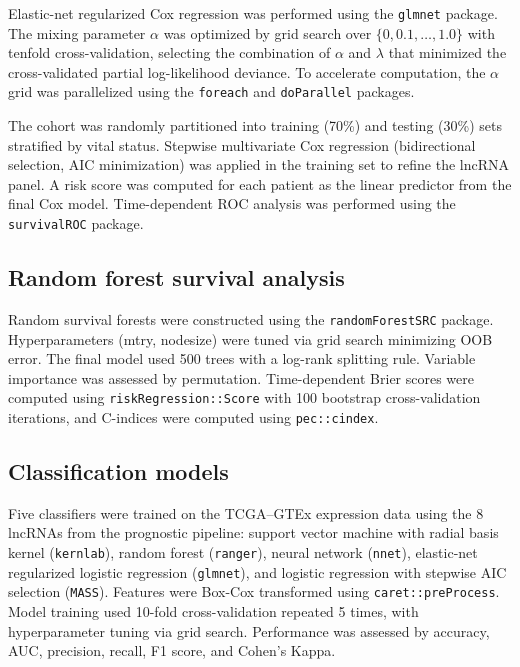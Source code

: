 \documentclass[fleqn,10pt]{wlscirep}
\begin{document}
Elastic-net regularized Cox regression was performed using the \texttt{glmnet} package. The mixing parameter $\alpha$ was optimized by grid search over $\{0, 0.1, \ldots, 1.0\}$ with tenfold cross-validation, selecting the combination of $\alpha$ and $\lambda$ that minimized the cross-validated partial log-likelihood deviance. To accelerate computation, the $\alpha$ grid was parallelized using the \texttt{foreach} and \texttt{doParallel} packages.

The cohort was randomly partitioned into training (70\%) and testing (30\%) sets stratified by vital status. Stepwise multivariate Cox regression (bidirectional selection, AIC minimization) was applied in the training set to refine the lncRNA panel. A risk score was computed for each patient as the linear predictor from the final Cox model. Time-dependent ROC analysis was performed using the \texttt{survivalROC} package.

\subsection*{Random forest survival analysis}

Random survival forests were constructed using the \texttt{randomForestSRC} package. Hyperparameters (mtry, nodesize) were tuned via grid search minimizing OOB error. The final model used 500 trees with a log-rank splitting rule. Variable importance was assessed by permutation. Time-dependent Brier scores were computed using \texttt{riskRegression::Score} with 100 bootstrap cross-validation iterations, and C-indices were computed using \texttt{pec::cindex}.

\subsection*{Classification models}

Five classifiers were trained on the TCGA--GTEx expression data using the 8 lncRNAs from the prognostic pipeline: support vector machine with radial basis kernel (\texttt{kernlab}), random forest (\texttt{ranger}), neural network (\texttt{nnet}), elastic-net regularized logistic regression (\texttt{glmnet}), and logistic regression with stepwise AIC selection (\texttt{MASS}). Features were Box-Cox transformed using \texttt{caret::preProcess}. Model training used 10-fold cross-validation repeated 5 times, with hyperparameter tuning via grid search. Performance was assessed by accuracy, AUC, precision, recall, F1 score, and Cohen's Kappa.
\end{document}
